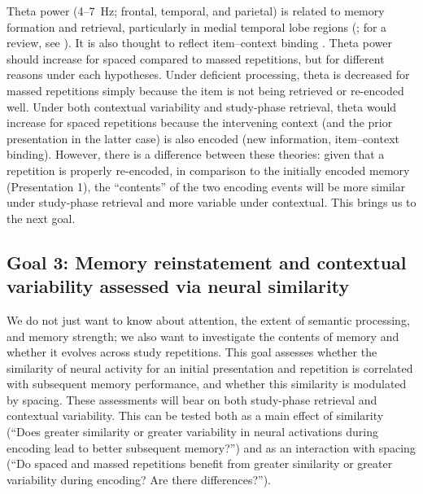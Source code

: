 Theta power (4--7~Hz; frontal, temporal, and parietal) is related to memory formation and retrieval, particularly in medial temporal lobe regions (; for a review, see ).  It is also thought to reflect item--context binding \cite{HansEtal2009a,HansEtal2011a,StauHans2013,SummMang2005}.  Theta power should increase for spaced compared to massed repetitions, but for different reasons under each hypotheses.  Under deficient processing, theta is decreased for massed repetitions simply because the item is not being retrieved or re-encoded well.
Under both contextual variability and study-phase retrieval, theta would increase for spaced repetitions because the intervening context (and the prior presentation in the latter case) is also encoded (new information, item--context binding).
However, there is a difference between these theories: given that a repetition is properly re-encoded, in comparison to the initially encoded memory (Presentation 1), the ``contents'' of the two encoding events will be more similar under study-phase retrieval and more variable under contextual.  This brings us to the next goal.




\subsection{Goal 3: Memory reinstatement and contextual variability assessed via neural similarity}

We do not just want to know about attention, the extent of semantic processing, and memory strength; we also want to investigate the contents of memory and whether it evolves across study repetitions.
This goal assesses whether the similarity of neural activity for an initial presentation and repetition is correlated with subsequent memory performance, and whether this similarity is modulated by spacing.  These assessments will bear on both study-phase retrieval and contextual variability.  This can be tested both as a main effect of similarity (``Does greater similarity or greater variability in neural activations during encoding lead to better subsequent memory?'') and as an interaction with spacing (``Do spaced and massed repetitions benefit from greater similarity or greater variability during encoding?  Are there differences?'').

